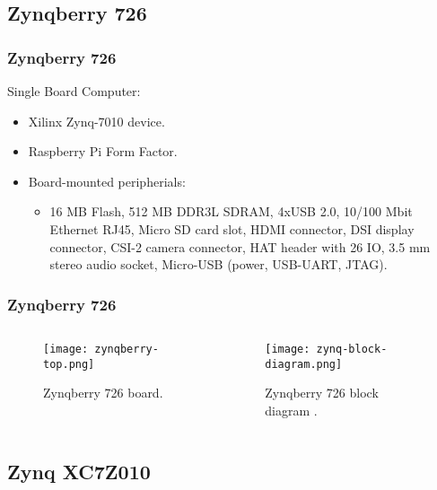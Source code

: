 
\subsection{Zynqberry 726}

\begin{frame}
	\frametitle{Zynqberry 726}
	Single Board Computer: \pause
	\begin{itemize}
		\item Xilinx Zynq-7010 device. \pause
		\item Raspberry Pi Form Factor. \pause
		\item Board-mounted peripherials:
		\begin{itemize}
			\item 16 MB Flash, 512 MB DDR3L SDRAM, 4xUSB 2.0, 10/100 Mbit Ethernet RJ45, Micro SD card slot, HDMI connector, DSI display connector, CSI-2 camera connector, HAT header with 26 IO, 3.5 mm stereo audio socket, Micro-USB (power, USB-UART, JTAG).
		\end{itemize}
	\end{itemize}
\end{frame}

\begin{frame}
	\frametitle{Zynqberry 726}
	\begin{columns}
		\begin{column}{0.4\textwidth}
			\begin{figure}
				\texttt{[image: zynqberry-top.png]}
				\caption{Zynqberry 726 board.}\label{fig:zynqberry-top}
			\end{figure}
		\end{column} \pause
		\begin{column}{0.5\textwidth}
			\begin{figure}
				\texttt{[image: zynq-block-diagram.png]}
				\caption{Zynqberry 726 block diagram \cite{zynq-trm}.}\label{fig:zynq-block-diagram}
			\end{figure}
		\end{column}
	\end{columns}
\end{frame}

\subsection{Zynq XC7Z010}

